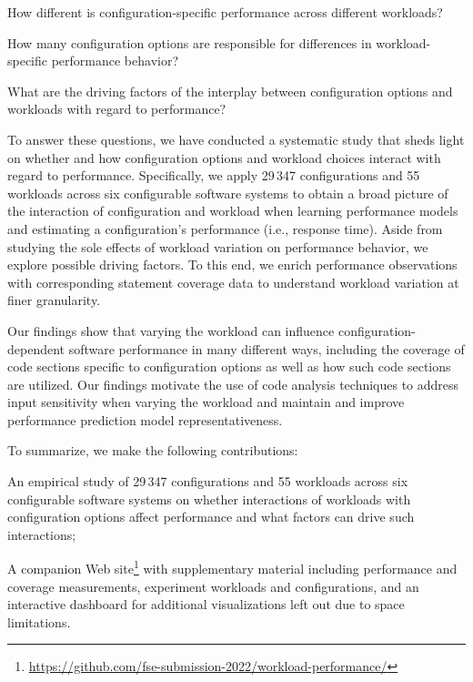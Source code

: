 \begin{compactitem}
	\item How different is configuration-specific performance across different workloads? 
	\item How many configuration options are responsible for differences in workload-specific performance behavior?
	\item What are the driving factors of the interplay between configuration options and workloads with regard to performance? 
\end{compactitem}

To answer these questions, we have conducted a systematic study that sheds light on whether and how configuration options and workload choices interact with regard to performance. 
Specifically, we apply 29\,347 configurations and 55 workloads across six configurable software systems to obtain a broad picture of the interaction of configuration and workload when learning performance models and estimating a configuration's performance (i.e., response time). Aside from studying the sole effects of workload variation on performance behavior, we explore possible driving factors. To this end, we enrich performance observations with corresponding statement coverage data to understand workload variation at finer granularity.

Our findings show that varying the workload can influence con\-fi\-gu\-ra\-tion-de\-pen\-dent software performance in many different ways, including the coverage of code sections specific to configuration options as well as how such code sections are utilized. Our findings motivate the use of code analysis techniques to address input sensitivity when varying the workload and maintain and improve performance prediction model representativeness.

To summarize, we make the following contributions: 

\begin{compactitem}
	\item An empirical study of 29\,347 configurations and 55 workloads across six configurable software systems on whether interactions of workloads with configuration options affect performance and what factors can drive such interactions;
	
	\item A companion Web site\footnote{\url{https://github.com/fse-submission-2022/workload-performance/}} with supplementary material including performance and coverage measurements, experiment workloads and configurations, and an interactive dashboard for additional visualizations left out due to space limitations.
\end{compactitem}


